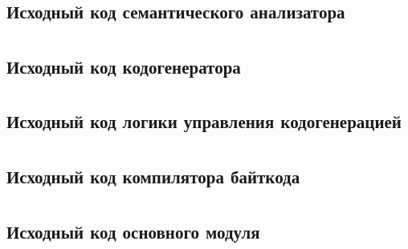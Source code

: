 \documentclass[a4paper,12pt]{article}
\numberwithin{equation}{section}
\begin{document}
\section*{}
\subsection*{Исходный код семантического анализатора}

\clearpage

\section*{}
\subsection*{Исходный код кодогенератора}

\clearpage

\section*{}
\subsection*{Исходный код логики управления кодогенерацией}

\clearpage

\section*{}
\subsection*{Исходный код компилятора байткода}

\clearpage

\section*{}
\subsection*{Исходный код основного модуля}

\clearpage
\end{document}
